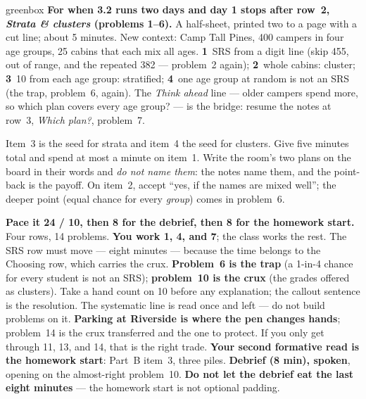 \documentclass[10pt]{article}
\begin{document}
\boxguard
\begin{skillbox}{greenbox}
\textbf{For when 3.2 runs two days and day 1 stops after row~2, \emph{Strata \& clusters}
(problems 1--6).} A half-sheet, printed two to a page with a cut line; about 5 minutes. New
context: Camp Tall Pines, 400 campers in four age groups, 25 cabins that each mix all ages.
\textbf{1}~SRS from a digit line (skip 455, out of range, and the repeated 382 --- problem~2
again); \textbf{2}~whole cabins: cluster; \textbf{3}~10 from each age group: stratified;
\textbf{4}~one age group at random is not an SRS (the trap, problem~6, again). The \emph{Think
ahead} line --- older campers spend more, so which plan covers every age group? --- is the bridge:
resume the notes at row~3, \emph{Which plan?}, problem~7.
\end{skillbox}

\begin{teachernote}[Warm-Up]
Item~3 is the seed for strata and item~4 the seed for clusters. Give five minutes total and
spend at most a minute on item~1. Write the room's two plans on the board in their words and
\emph{do not name them}: the notes name them, and the point-back is the payoff. On item~2,
accept ``yes, if the names are mixed well''; the deeper point (equal chance for every
\emph{group}) comes in problem~6.
\end{teachernote}

\begin{teachernote}
\textbf{Pace it 24 / 10, then 8 for the debrief, then 8 for the homework start.} Four rows, 14
problems. \textbf{You work 1, 4, and 7}; the class works the rest. The SRS row must move ---
eight minutes --- because the time belongs to the Choosing row, which carries the crux.
\textbf{Problem~6 is the trap} (a 1-in-4 chance for every student is not an SRS);
\textbf{problem~10 is the crux} (the grades offered as clusters). Take a hand count on 10
before any explanation; the callout sentence is the resolution. The systematic line is read
once and left --- do not build problems on it. \textbf{Parking at Riverside is where the pen
changes hands}; problem~14 is the crux transferred and the one to protect. If you only get
through 11, 13, and 14, that is the right trade. \textbf{Your second formative read is the
homework start}: Part~B item~3, three piles. \textbf{Debrief (8 min), spoken}, opening on the
almost-right problem~10. \textbf{Do not let the debrief eat the last eight minutes} --- the
homework start is not optional padding.
\end{teachernote}
\end{document}
